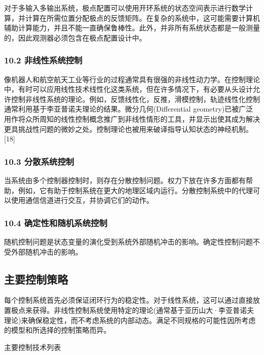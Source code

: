 对于多输入多输出系统，极点配置可以使用开环系统的状态空间表示进行数学计算，并计算在所需位置分配极点的反馈矩阵。在复杂的系统中，这可能需要计算机辅助计算能力，并且不能一直确保鲁棒性。此外，并非所有系统状态都是一般测量的，因此观测器必须包含在极点配置设计中。

\subsubsection{10.2 非线性系统控制}

像机器人和航空航天工业等行业的过程通常具有很强的非线性动力学。在控制理论中，有时可以应用线性技术线性化这类系统，但在许多情况下，有必要从头设计允许控制非线性系统的理论。例如，反馈线性化，反推，滑模控制，轨迹线性化控制通常利用基于李亚普诺夫理论的结果。微分几何(Differential geometry)已被广泛用作将众所周知的线性控制概念推广到非线性情形的工具，并显示出使其成为解决更具挑战性问题的微妙之处。控制理论也被用来破译指导认知状态的神经机制。[18]

\subsubsection{10.3 分散系统控制}

当系统由多个控制器控制时，则存在分散控制问题。权力下放在许多方面都有帮助，例如，它有助于控制系统在更大的地理区域内运行。分散控制系统中的代理可以使用通信信道进行交互，并协调它们的动作。

\subsubsection{10.4 确定性和随机系统控制}

随机控制问题是状态变量的演化受到系统外部随机冲击的影响。确定性控制问题不受外部随机冲击的影响。

\subsection{主要控制策略}

每个控制系统首先必须保证闭环行为的稳定性。对于线性系统，这可以通过直接放置极点来获得。非线性控制系统使用特定的理论(通常基于亚历山大·李亚普诺夫理论)来确保稳定性，而不考虑系统的内部动态。满足不同规格的可能性因所考虑的模型和所选择的控制策略而异。

主要控制技术列表

